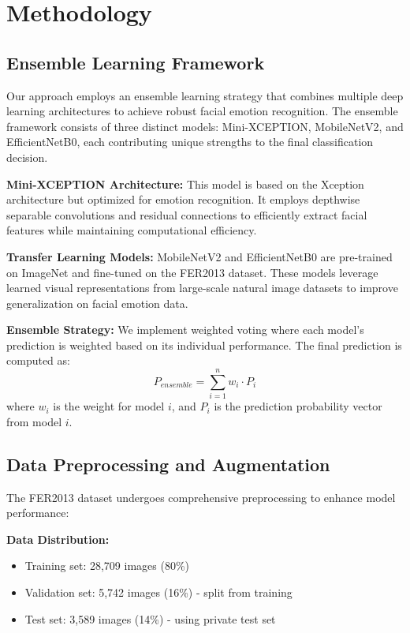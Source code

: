 
\section{Methodology}

\subsection{Ensemble Learning Framework}
Our approach employs an ensemble learning strategy that combines multiple deep learning architectures to achieve robust facial emotion recognition. The ensemble framework consists of three distinct models: Mini-XCEPTION, MobileNetV2, and EfficientNetB0, each contributing unique strengths to the final classification decision.

\textbf{Mini-XCEPTION Architecture:} This model is based on the Xception architecture but optimized for emotion recognition. It employs depthwise separable convolutions and residual connections to efficiently extract facial features while maintaining computational efficiency.

\textbf{Transfer Learning Models:} MobileNetV2 and EfficientNetB0 are pre-trained on ImageNet and fine-tuned on the FER2013 dataset. These models leverage learned visual representations from large-scale natural image datasets to improve generalization on facial emotion data.

\textbf{Ensemble Strategy:} We implement weighted voting where each model's prediction is weighted based on its individual performance. The final prediction is computed as:
\begin{equation}
P_{ensemble} = \sum_{i=1}^{n} w_i \cdot P_i
\end{equation}
where $w_i$ is the weight for model $i$, and $P_i$ is the prediction probability vector from model $i$.

\subsection{Data Preprocessing and Augmentation}
The FER2013 dataset undergoes comprehensive preprocessing to enhance model performance:

\textbf{Data Distribution:}
\begin{itemize}
    \item Training set: 28,709 images (80\%)
    \item Validation set: 5,742 images (16\%) - split from training
    \item Test set: 3,589 images (14\%) - using private test set
\end{itemize}

